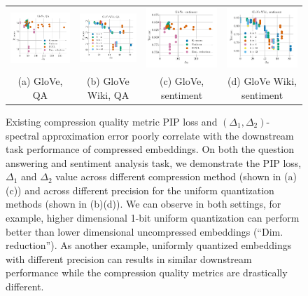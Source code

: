 \begin{figure}
\begin{tabular}{@{\hskip -0.0in}c@{\hskip -0.0in}c@{\hskip -0.0in}c@{\hskip -0.0in}c@{\hskip -0.0in}}
		\includegraphics[width=.245\linewidth]{figures/glove400k_qa_best-f1_vs_gram-large-dim-delta2-2_linx.pdf} &
		\includegraphics[width=.245\linewidth]{figures/glove-wiki400k-am_qa_best-f1_vs_gram-large-dim-delta2-2_linx.pdf} &
		\includegraphics[width=.245\linewidth]{figures/glove400k_sentiment_sst_test-acc_vs_gram-large-dim-delta2-2_linx.pdf} &
		\includegraphics[width=.245\linewidth]{figures/glove-wiki400k-am_sentiment_sst_test-acc_vs_gram-large-dim-delta2-2_linx.pdf} \\
		(a) GloVe, QA & (b) GloVe Wiki, QA  & (c) GloVe, sentiment & (d) GloVe Wiki, sentiment
	\end{tabular}
	\caption{Existing compression quality metric PIP loss and $(\Delta_1, \Delta_2)$-spectral approximation error poorly correlate with the downstream task performance of compressed embeddings. On both the question answering and sentiment analysis task, we demonstrate the PIP loss, $\Delta_1$ and $\Delta_2$ value across different compression method (shown in (a)(c)) and across different precision for the uniform quantization methods (shown in (b)(d)). We can observe in both settings, for example, higher dimensional 1-bit uniform quantization can perform better than lower dimensional uncompressed embeddings (``Dim. reduction''). As another example, uniformly quantized embeddings with different precision can results in similar downstream performance while the compression quality metrics are drastically different.}
	\label{fig:bad_correlation}
\end{figure}
